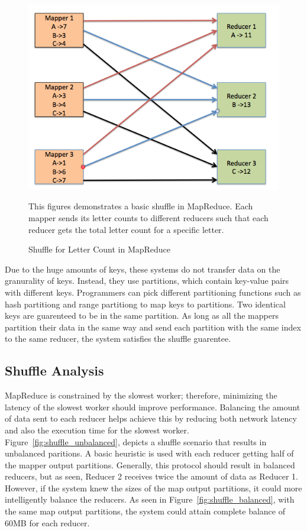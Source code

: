 \begin{figure}[h]
\begin{center}
\includegraphics[scale=0.6]{./img/shuffle_basic.png}
\caption{Shuffle for Letter Count in MapReduce}
\label{fig:shuffle_basic}
\end{center}
This figures demonstrates a basic shuffle in MapReduce. 
Each mapper sends its letter counts to different reducers such that each reducer
gets the total letter count for a specific letter.
\end{figure}
Due to the huge amounts of keys, these systems do not transfer data on the granurality of keys.
Instead, they use partitions, which contain key-value pairs with different keys. Programmers can pick different partitioning functions such as hash partitiong and range partitiong to map keys to partitions. Two identical keys are guarenteed to be in the same partition. As long as all the mappers partition their data in the same way and send each partition with the same index to the same reducer, the system satisfies 
the shuffle guarentee. 

\subsection {Shuffle Analysis}

MapReduce is constrained by the slowest worker; therefore, minimizing the latency of the slowest worker should improve performance.
Balancing the amount of data sent to each reducer helps achieve this by reducing both network latency and also the execution time for the slowest worker.
Figure~\ref{fig:shuffle_unbalanced}, depicts a shuffle scenario that results in unbalanced paritions. A basic heuristic is used with each reducer getting half of the mapper output partitions. Generally, this protocol should result in  balanced reducers, but as seen, Reducer 2 receives 
twice the amount of data as Reducer 1. However, if the system knew the sizes of the map output partitions,
it could more intelligently balance the reducers. As seen in Figure~\ref{fig:shuffle_balanced}, with the same map output partitions, the system could attain complete balance
of 60MB for each reducer.


